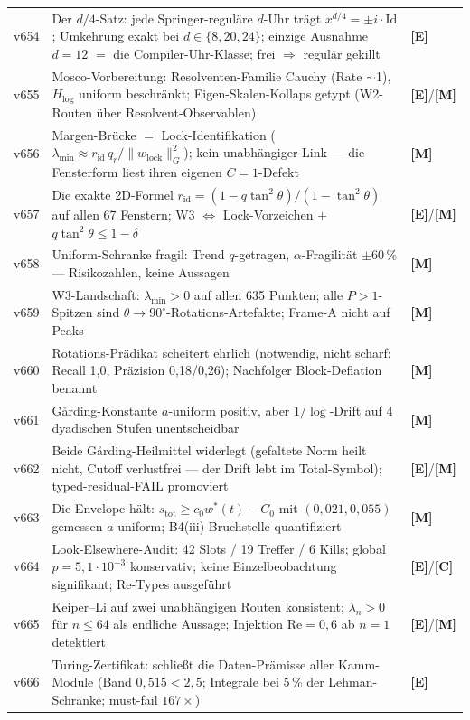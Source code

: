 \documentclass[11pt,a4paper]{article}
\newcommand{\E}{\textcolor{gut}{\textbf{[E]}}}
\newcommand{\C}{\textcolor{kern}{\textbf{[C]}}}
\newcommand{\M}{\textcolor{mess}{\textbf{[M]}}}
\begin{document}
\begin{longtable}{@{}l p{11.1cm} l@{}}
v654 & Der $d/4$-Satz: jede Springer-reguläre $d$-Uhr trägt $x^{d/4} = \pm i \cdot \mathrm{Id}$; Umkehrung exakt bei $d \in \{8, 20, 24\}$; einzige Ausnahme $d = 12$ $=$ die Compiler-Uhr-Klasse; \glqq{}frei $\Rightarrow$ regulär\grqq{} gekillt & \E \\
v655 & Mosco-Vorbereitung: Resolventen-Familie Cauchy (Rate $\sim$1), $H_{\log}$ uniform beschränkt; Eigen-Skalen-Kollaps getypt (W2-Routen über Resolvent-Observablen) & \E/\M \\
v656 & Margen-Brücke $=$ Lock-Identifikation ($\lambda_{\min} \approx r_{\mathrm{id}}\, q_r / \|w_{\mathrm{lock}}\|_G^2$); kein unabhängiger Link --- die Fensterform liest ihren eigenen $C = 1$-Defekt & \M \\
v657 & Die exakte 2D-Formel $r_{\mathrm{id}} = (1 - q\tan^2\theta)/(1 - \tan^2\theta)$ auf allen 67 Fenstern; W3 $\Leftrightarrow$ Lock-Vorzeichen $+$ $q\tan^2\theta \le 1 - \delta$ & \E/\M \\
v658 & Uniform-Schranke fragil: Trend $q$-getragen, $\alpha$-Fragilität $\pm 60\,\%$ --- Risikozahlen, keine Aussagen & \M \\
v659 & W3-Landschaft: $\lambda_{\min} > 0$ auf allen 635 Punkten; alle $P > 1$-Spitzen sind $\theta \to 90^\circ$-Rotations-Artefakte; Frame-A nicht auf Peaks & \M \\
v660 & Rotations-Prädikat scheitert ehrlich (notwendig, nicht scharf: Recall 1{,}0, Präzision 0{,}18/0{,}26); Nachfolger Block-Deflation benannt & \M \\
v661 & Gårding-Konstante $a$-uniform positiv, aber $1/\log$-Drift auf 4 dyadischen Stufen unentscheidbar & \M \\
v662 & Beide Gårding-Heilmittel widerlegt (gefaltete Norm heilt nicht, Cutoff verlustfrei --- der Drift lebt im Total-Symbol); typed-residual-FAIL promoviert & \E/\M \\
v663 & Die Envelope hält: $s_{\mathrm{tot}} \ge c_0 w^*(t) - C_0$ mit $(0{,}021, 0{,}055)$ gemessen $a$-uniform; B4(iii)-Bruchstelle quantifiziert & \M \\
v664 & Look-Elsewhere-Audit: 42 Slots / 19 Treffer / 6 Kills; global $p = 5{,}1 \cdot 10^{-3}$ konservativ; keine Einzelbeobachtung signifikant; Re-Types ausgeführt & \E/\C \\
v665 & Keiper--Li auf zwei unabhängigen Routen konsistent; $\lambda_n > 0$ für $n \le 64$ als endliche Aussage; Injektion $\mathrm{Re} = 0{,}6$ ab $n = 1$ detektiert & \E/\M \\
v666 & Turing-Zertifikat: schließt die Daten-Prämisse aller Kamm-Module (Band $0{,}515 < 2{,}5$; Integrale bei 5\,\% der Lehman-Schranke; must-fail $167\times$) & \E \\

\end{longtable}
\end{document}
